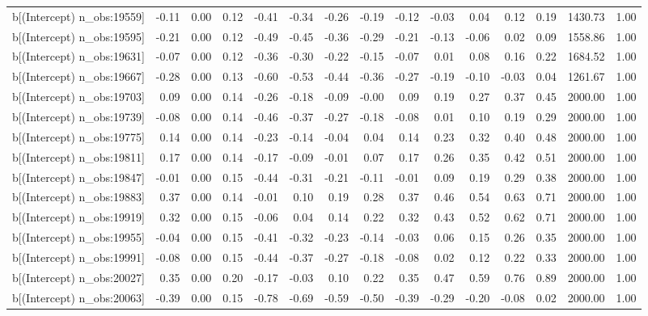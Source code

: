 \begin{table}[ht]
\begin{tabular}{rrrrrrrrrrrrrrr}
  b[(Intercept) n\_obs:19559] & -0.11 & 0.00 & 0.12 & -0.41 & -0.34 & -0.26 & -0.19 & -0.12 & -0.03 & 0.04 & 0.12 & 0.19 & 1430.73 & 1.00 \\ 
  b[(Intercept) n\_obs:19595] & -0.21 & 0.00 & 0.12 & -0.49 & -0.45 & -0.36 & -0.29 & -0.21 & -0.13 & -0.06 & 0.02 & 0.09 & 1558.86 & 1.00 \\ 
  b[(Intercept) n\_obs:19631] & -0.07 & 0.00 & 0.12 & -0.36 & -0.30 & -0.22 & -0.15 & -0.07 & 0.01 & 0.08 & 0.16 & 0.22 & 1684.52 & 1.00 \\ 
  b[(Intercept) n\_obs:19667] & -0.28 & 0.00 & 0.13 & -0.60 & -0.53 & -0.44 & -0.36 & -0.27 & -0.19 & -0.10 & -0.03 & 0.04 & 1261.67 & 1.00 \\ 
  b[(Intercept) n\_obs:19703] & 0.09 & 0.00 & 0.14 & -0.26 & -0.18 & -0.09 & -0.00 & 0.09 & 0.19 & 0.27 & 0.37 & 0.45 & 2000.00 & 1.00 \\ 
  b[(Intercept) n\_obs:19739] & -0.08 & 0.00 & 0.14 & -0.46 & -0.37 & -0.27 & -0.18 & -0.08 & 0.01 & 0.10 & 0.19 & 0.29 & 2000.00 & 1.00 \\ 
  b[(Intercept) n\_obs:19775] & 0.14 & 0.00 & 0.14 & -0.23 & -0.14 & -0.04 & 0.04 & 0.14 & 0.23 & 0.32 & 0.40 & 0.48 & 2000.00 & 1.00 \\ 
  b[(Intercept) n\_obs:19811] & 0.17 & 0.00 & 0.14 & -0.17 & -0.09 & -0.01 & 0.07 & 0.17 & 0.26 & 0.35 & 0.42 & 0.51 & 2000.00 & 1.00 \\ 
  b[(Intercept) n\_obs:19847] & -0.01 & 0.00 & 0.15 & -0.44 & -0.31 & -0.21 & -0.11 & -0.01 & 0.09 & 0.19 & 0.29 & 0.38 & 2000.00 & 1.00 \\ 
  b[(Intercept) n\_obs:19883] & 0.37 & 0.00 & 0.14 & -0.01 & 0.10 & 0.19 & 0.28 & 0.37 & 0.46 & 0.54 & 0.63 & 0.71 & 2000.00 & 1.00 \\ 
  b[(Intercept) n\_obs:19919] & 0.32 & 0.00 & 0.15 & -0.06 & 0.04 & 0.14 & 0.22 & 0.32 & 0.43 & 0.52 & 0.62 & 0.71 & 2000.00 & 1.00 \\ 
  b[(Intercept) n\_obs:19955] & -0.04 & 0.00 & 0.15 & -0.41 & -0.32 & -0.23 & -0.14 & -0.03 & 0.06 & 0.15 & 0.26 & 0.35 & 2000.00 & 1.00 \\ 
  b[(Intercept) n\_obs:19991] & -0.08 & 0.00 & 0.15 & -0.44 & -0.37 & -0.27 & -0.18 & -0.08 & 0.02 & 0.12 & 0.22 & 0.33 & 2000.00 & 1.00 \\ 
  b[(Intercept) n\_obs:20027] & 0.35 & 0.00 & 0.20 & -0.17 & -0.03 & 0.10 & 0.22 & 0.35 & 0.47 & 0.59 & 0.76 & 0.89 & 2000.00 & 1.00 \\ 
  b[(Intercept) n\_obs:20063] & -0.39 & 0.00 & 0.15 & -0.78 & -0.69 & -0.59 & -0.50 & -0.39 & -0.29 & -0.20 & -0.08 & 0.02 & 2000.00 & 1.00 \\ 

\end{tabular}
\end{table}
